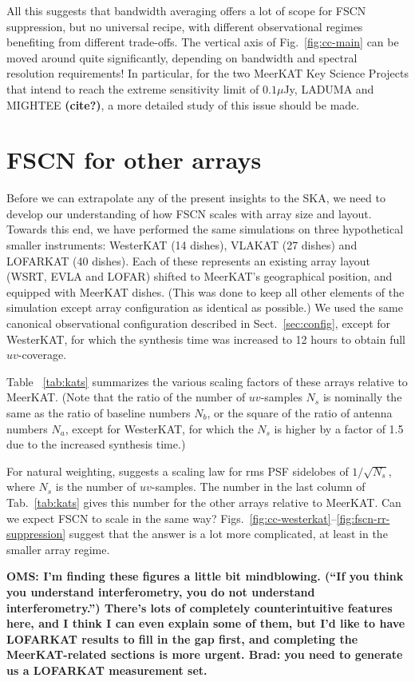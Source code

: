 \documentclass{aa}
\begin{document}
All this suggests that bandwidth averaging offers a lot of scope for FSCN suppression, but no universal recipe, with different observational regimes benefiting from different trade-offs. The vertical axis of Fig.~\ref{fig:cc-main} can be moved around quite significantly, depending on bandwidth and spectral resolution requirements! In particular, for the two MeerKAT Key Science Projects that intend to reach the extreme sensitivity limit of $0.1\mu$Jy, LADUMA and MIGHTEE {\bf (cite?)}, a more detailed study of this issue should be made.

\section{FSCN for other arrays}
\label{sec:ifr-size}

Before we can extrapolate any of the present insights to the SKA, we need to develop our understanding of how FSCN scales with array size and layout. Towards this end, we have performed the same simulations on three hypothetical smaller instruments: WesterKAT (14 dishes), VLAKAT (27 dishes) and LOFARKAT (40 dishes). Each of these represents an existing array layout (WSRT, EVLA and LOFAR) shifted to MeerKAT's geographical position, and equipped with MeerKAT dishes. (This was done to keep all other elements of the simulation except array configuration as identical as possible.) We used the same canonical observational configuration described in Sect.~\ref{sec:config}, except for WesterKAT, for which the synthesis time was increased to 12 hours to obtain full $uv$-coverage. 

Table ~\ref{tab:kats} summarizes the various scaling factors of these arrays relative to MeerKAT. (Note that the ratio of the number of $uv$-samples $N_s$ is nominally the same as the ratio of baseline numbers $N_b$, or the square of the ratio of antenna numbers $N_a$, except for WesterKAT, for which the $N_s$ is higher by a factor of 1.5 due to the increased synthesis time.) 

For natural weighting, \citet{SKA49} suggests a scaling law for rms PSF sidelobes of $1/\sqrt{N_s}$, where $N_s$ is the number of $uv$-samples. The number in the last column of Tab.~\ref{tab:kats} gives this number for the other arrays relative to MeerKAT. Can we expect FSCN to scale in the same way? Figs.~\ref{fig:cc-westerkat}--\ref{fig:fscn-rr-suppression} suggest that the answer is a lot more complicated, at least in the smaller array regime. 

{\bf OMS: I'm finding these figures a little bit mindblowing. (``If you think you understand interferometry, you do not understand interferometry.'')  There's lots of completely counterintuitive features here, and I think I can even explain some of them, but I'd like to have LOFARKAT results to fill in the gap first, and completing the MeerKAT-related sections is more urgent. Brad: you need to generate us a LOFARKAT measurement set.}
\end{document}
